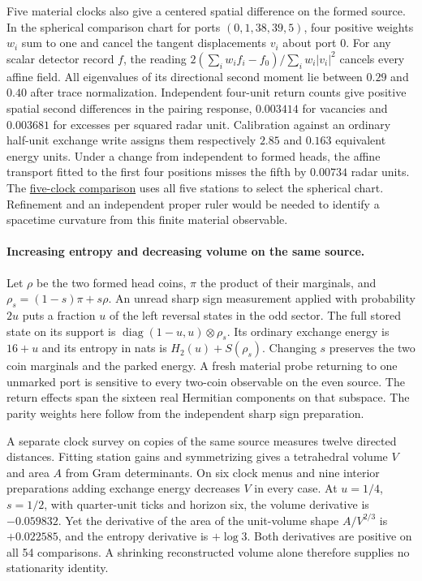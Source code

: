 \documentclass[11pt]{article}
\begin{document}
Five material clocks also give a centered spatial difference on the
formed source. In the spherical comparison chart for ports
$(0,1,38,39,5)$, four positive weights $w_i$ sum to one and cancel
the tangent displacements $v_i$ about port 0. For any scalar
detector record $f$, the reading
$2(\sum_iw_i f_i-f_0)/\sum_iw_i|v_i|^2$ cancels every affine
field. All eigenvalues of its directional second moment lie between
$0.29$ and $0.40$ after trace normalization. Independent four-unit
return counts give positive spatial second differences in the
pairing response, $0.003414$ for vacancies and $0.003681$ for excesses
per squared radar unit. Calibration against an ordinary half-unit
exchange write assigns them respectively $2.85$ and $0.163$ equivalent
energy units. Under a change from independent to formed heads, the
affine transport fitted to the first four positions misses the fifth
by $0.00734$ radar units. The
\href{https://github.com/FloatingPragma/observer-patch-holography/tree/main/code/matched_einstein_limit/source_implication/full_geometry/station_balls/reciprocal_screen/range_contraction/formed_ranges/affine_stencil}{five-clock comparison}
uses all five stations to select the spherical chart. Refinement and an
independent proper ruler would be needed to identify a spacetime
curvature from this finite material observable.

\paragraph{Increasing entropy and decreasing volume on the same source.}
Let $\rho$ be the two formed head coins, $\pi$ the product of their
marginals, and $\rho_s=(1-s)\pi+s\rho$. An unread sharp sign
measurement applied with probability $2u$ puts a fraction $u$ of the
left reversal states in the odd sector. The full stored state on its
support is $\operatorname{diag}(1-u,u)\otimes\rho_s$. Its ordinary
exchange energy is $16+u$ and its entropy in nats is
$H_2(u)+S(\rho_s)$. Changing $s$ preserves the two coin marginals
and the parked energy. A fresh material probe returning to one unmarked
port is sensitive to every two-coin observable on the even source.
The return effects span the sixteen real Hermitian components on
that subspace. The parity weights here follow from the independent
sharp sign preparation.

A separate clock survey on copies of the same source measures twelve
directed distances. Fitting station gains and symmetrizing gives a
tetrahedral volume $V$ and area $A$ from Gram determinants. On six
clock menus and nine interior preparations adding exchange energy
decreases $V$ in every case. At $u=1/4$, $s=1/2$, with quarter-unit
ticks and horizon six, the volume derivative is $-0.059832$.
Yet the derivative of the area of the unit-volume shape $A/V^{2/3}$
is $+0.022585$, and the entropy derivative is $+\log 3$. Both
derivatives are positive on all 54 comparisons. A shrinking
reconstructed volume alone therefore supplies no stationarity identity.
\end{document}
